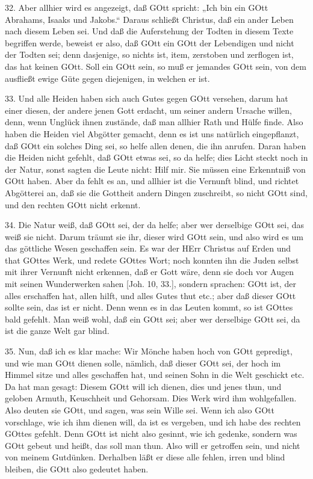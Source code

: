 32. Aber allhier wird es angezeigt, daß GOtt spricht: „Ich bin ein GOtt Abrahams, Isaaks und Jakobs.“ Daraus schließt Christus, daß ein ander Leben nach diesem Leben sei. Und daß die Auferstehung der Todten in diesem Texte begriffen werde, beweist er also, daß GOtt ein GOtt der Lebendigen und nicht der Todten sei; denn dasjenige, so nichts ist, item, zerstoben und zerflogen ist, das hat keinen GOtt. Soll ein GOtt sein, so muß er jemandes GOtt sein, von dem ausfließt ewige Güte gegen diejenigen, in welchen er ist.

33. Und alle Heiden haben sich auch Gutes gegen GOtt versehen, darum hat einer diesen, der andere jenen Gott erdacht, um seiner andern Ursache willen, denn, wenn Unglück ihnen zustände, daß man allhier Rath und Hülfe finde. Also haben die Heiden viel Abgötter gemacht, denn es ist uns natürlich eingepflanzt, daß GOtt ein solches Ding sei, so helfe allen denen, die ihn anrufen. Daran haben die Heiden nicht gefehlt, daß GOtt etwas sei, so da helfe; dies Licht steckt noch in der Natur, sonst sagten die Leute nicht: Hilf mir. Sie müssen eine Erkenntniß von GOtt haben. Aber da fehlt es an, und allhier ist die Vernunft blind, und richtet Abgötterei an, daß sie die Gottheit andern Dingen zuschreibt, so nicht GOtt sind, und den rechten GOtt nicht erkennt.

34. Die Natur weiß, daß GOtt sei, der da helfe; aber wer derselbige GOtt sei, das weiß sie nicht. Darum träumt sie ihr, dieser wird GOtt sein, und also wird es um das göttliche Wesen geschaffen sein. Es war der HErr Christus auf Erden und that GOttes Werk, und redete GOttes Wort; noch konnten ihn die Juden selbst mit ihrer Vernunft nicht erkennen, daß er Gott wäre, denn sie doch vor Augen mit seinen Wunderwerken sahen [Joh. 10, 33.], sondern sprachen: GOtt ist, der alles erschaffen hat, allen hilft, und alles Gutes thut etc.; aber daß dieser GOtt sollte sein, das ist er nicht. Denn wenn es in das Leuten kommt, so ist GOttes bald gefehlt. Man weiß wohl, daß ein GOtt sei; aber wer derselbige GOtt sei, da ist die ganze Welt gar blind.

35. Nun, daß ich es klar mache: Wir Mönche haben hoch von GOtt gepredigt, und wie man GOtt dienen solle, nämlich, daß dieser GOtt sei, der hoch im Himmel sitze und alles geschaffen hat, und seinen Sohn in die Welt geschickt etc. Da hat
man gesagt: Diesem GOtt will ich dienen, dies und jenes thun, und geloben Armuth, Keuschheit und Gehorsam. Dies Werk wird ihm wohlgefallen. Also deuten sie GOtt, und sagen, was sein Wille sei. Wenn ich also GOtt vorschlage, wie ich ihm dienen will, da ist es vergeben, und ich habe des rechten GOttes gefehlt. Denn GOtt ist nicht also gesinnt, wie ich gedenke, sondern was GOtt gebeut und heißt, das soll man thun. Also will er getroffen sein, und nicht von meinem Gutdünken. Derhalben läßt er diese alle fehlen, irren und blind bleiben, die GOtt also gedeutet haben.

